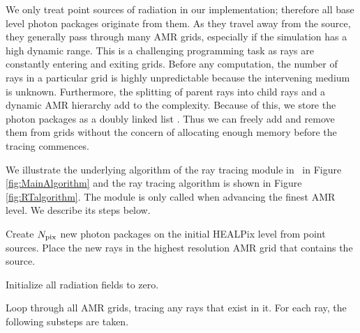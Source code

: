 \documentclass[useAMS,usenatbib,a4paper]{mn2e}
\begin{document}
We only treat point sources of radiation in our implementation;
therefore all base level photon packages originate from them.  As they
travel away from the source, they generally pass through many AMR
grids, especially if the simulation has a high dynamic range.  This is
a challenging programming task as rays are constantly entering and
exiting grids.  Before any computation, the number of rays in a
particular grid is highly unpredictable because the intervening medium
is unknown.  Furthermore, the splitting of parent rays into child rays
and a dynamic AMR hierarchy add to the complexity.  Because of this,
we store the photon packages as a doubly linked list
\citep{Abel02_RT}.  Thus we can freely add and remove them from grids
without the concern of allocating enough memory before the tracing
commences.

\begin{figure*}
  \caption{\label{fig:MainAlgorithm} Flow chart for the overall
    algorithm of the radiative transfer module in \enzo~that
    illustrates (1) the creation of photon packages, (2) ray tracing,
    (3) the transport of photon packages between AMR grids, and (4)
    coupling with the hydrodynamics.  The ray tracing algorithm, which
    is contained in the ``Trace Rays'' is detailed in Figure
    \ref{fig:RTalgorithm}.}
\end{figure*}

\begin{figure*}
  \caption{\label{fig:RTalgorithm} Flow chart for the ray tracing
    algorithm for one photon passing through a grid.  Note that only
    one step is needed in the routine to adaptively split rays.  The
    remainder is a typical ray tracing method.}
\end{figure*}

We illustrate the underlying algorithm of the ray tracing module in
\enzo~in Figure \ref{fig:MainAlgorithm} and the ray tracing algorithm
is shown in Figure \ref{fig:RTalgorithm}.  The module is only called
when advancing the finest AMR level.  We describe its steps below.

 Create $N_{\rm pix}$ new photon packages on the initial
HEALPix level from point sources.  Place the new rays in the highest
resolution AMR grid that contains the source.

 Initialize all radiation fields to zero.

 Loop through all AMR grids, tracing any rays that exist in
it.  For each ray, the following substeps are taken.
\end{document}

